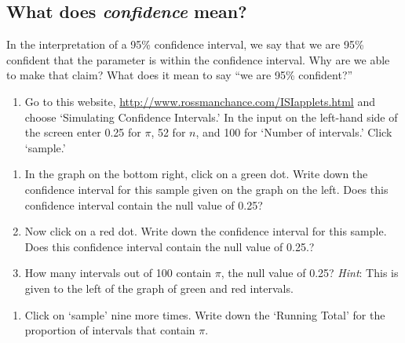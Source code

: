 \documentclass[
]{report}
\providecommand{\tightlist}{%
  \setlength{\itemsep}{0pt}\setlength{\parskip}{0pt}}
\begin{document}
\hypertarget{what-does-confidence-mean}{%
\subsection*{\texorpdfstring{What does \emph{confidence} mean?}{What does confidence mean?}}\label{what-does-confidence-mean}}

In the interpretation of a 95\% confidence interval, we say that we are 95\% confident that the parameter is within the confidence interval. Why are we able to make that claim? What does it mean to say ``we are 95\% confident?''

\begin{enumerate}
\def\labelenumi{\arabic{enumi}.}
\setcounter{enumi}{13}
\tightlist
\item
  Go to this website, \url{http://www.rossmanchance.com/ISIapplets.html} and choose `Simulating Confidence Intervals.' In the input on the left-hand side of the screen enter 0.25 for \(\pi\), 52 for \(n\), and 100 for `Number of intervals.' Click `sample.'
  \vspace{1mm}
\end{enumerate}

\begin{enumerate}
\def\labelenumi{\alph{enumi}.}
\item
  In the graph on the bottom right, click on a green dot. Write down the confidence interval for this sample given on the graph on the left. Does this confidence interval contain the null value of 0.25?
  \vspace{0.5in}
\item
  Now click on a red dot. Write down the confidence interval for this sample. Does this confidence interval contain the null value of 0.25.?
  \vspace{0.5in}
\item
  How many intervals out of 100 contain \(\pi\), the null value of 0.25? \emph{Hint}: This is given to the left of the graph of green and red intervals.
  \vspace{0.5in}
\end{enumerate}

\begin{enumerate}
\def\labelenumi{\arabic{enumi}.}
\setcounter{enumi}{14}
\tightlist
\item
  Click on `sample' nine more times. Write down the `Running Total' for the proportion of intervals that contain \(\pi\).
\end{enumerate}
\end{document}
